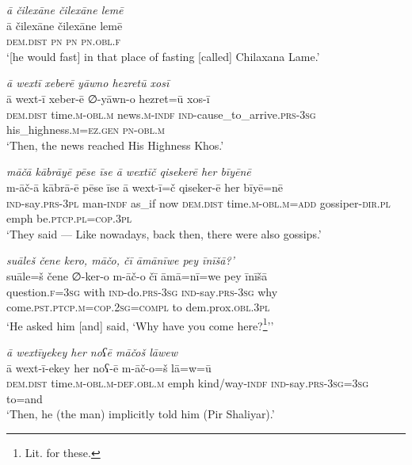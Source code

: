 \ea \label{ŽP.123}
\textit{ā čilexāne čilexāne lemē} \\ 
\gll ā čilexāne čilexāne lemē \\ 
 \textsc{dem.dist} \textsc{pn} \textsc{pn} \textsc{pn}\textsc{.obl}\textsc{.f} \\ 
\glt `[he would fast] in that place of fasting [called] Chilaxana Lame.'
\z 
 
\ea \label{ŽP.124}
\textit{ā wextī xeberē yāwno hezretū xosī} \\ 
\gll ā wext-ī xeber-ē ∅-yāwn-o hezret=ū xos-ī \\ 
 \textsc{dem.dist} time\textsc{.m}\textsc{-obl}\textsc{.m} news\textsc{.m}\textsc{-indf} \textsc{ind-}cause\_to\_arrive\textsc{.prs}\textsc{-3sg} his\_highness\textsc{.m}\textsc{\textsc{=ez.gen}} \textsc{pn}\textsc{-obl}\textsc{.m} \\ 
\glt `Then, the news reached His Highness Khos.'
\z 
 
\ea \label{ŽP.125}
\textit{māčā kābrāyē pēse īse ā wextīč qisekerē her bīyēnē} \\ 
\gll m-āč-ā kābrā-ē pēse īse ā wext-ī=č qiseker-ē her bīyē=nē \\ 
 \textsc{ind-}say\textsc{.prs}\textsc{-3pl} man\textsc{-indf} as\_if now \textsc{dem.dist} time\textsc{.m}\textsc{-obl}\textsc{.m}\textsc{=add} gossiper\textsc{-dir}\textsc{.pl} emph be\textsc{.ptcp}\textsc{.pl}\textsc{=cop}\textsc{.3pl} \\ 
\glt `They said — Like nowadays, back then, there were also gossips.'
\z 
 
\ea \label{ŽP.135}
\textit{suāleš čene kero, māčo, čī āmānīwe pey īnīšā?’} \\ 
\gll suāle=š čene ∅-ker-o m-āč-o čī āmā=nī=we pey īnīšā \\ 
 question\textsc{.f}\textsc{=3sg} with \textsc{ind-}do\textsc{.prs}\textsc{-3sg} \textsc{ind-}say\textsc{.prs}\textsc{-3sg} why come\textsc{.pst}\textsc{.ptcp}\textsc{.m}\textsc{=cop}\textsc{.\textsc{2sg}}\textsc{=compl} to dem.prox\textsc{.obl}\textsc{.3pl} \\ 
\glt `He asked him [and] said, ‘Why have you come here?\footnote{Lit. for these.}’'
\z 
 
\ea \label{ŽP.137}
\textit{ā wextīyekey her noʕē māčoš lāwew} \\ 
\gll ā wext-ī-ekey her noʕ-ē m-āč-o=š lā=w=ū \\ 
 \textsc{dem.dist} time\textsc{.m}\textsc{-obl}\textsc{.m}\textsc{-def}\textsc{.obl}\textsc{.m} emph kind/way\textsc{-indf} \textsc{ind-}say\textsc{.prs}\textsc{-3sg}\textsc{=3sg} to=and \\ 
\glt `Then, he (the man) implicitly told him (Pir Shaliyar).'
\z 
 
